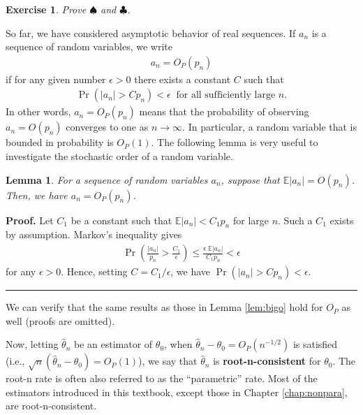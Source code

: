 \documentclass[10.5pt, A4paper, openany, uplatex]{book}
\newcommand{\E}{\mathbb{E}}
\renewcommand{\hat}{\widehat}
\newtheorem{exercise}[theorem]{Exercise}
\newtheorem{lemma}[theorem]{Lemma}
\newenvironment{proof}[1][Proof]{\textbf{#1.} }{\  \rule{0.5em}{0.5em}}
\numberwithin{equation}{section}
\begin{document}
\begin{framed}
	\begin{exercise}\upshape
		Prove $\spadesuit$ and $\clubsuit$.
	\end{exercise}
\end{framed}

So far, we have considered asymptotic behavior of real sequences.
If $a_n$ is a sequence of random variables, we write
\begin{align*}
	a_n = O_P(p_n)
\end{align*}
if for any given number $\epsilon > 0$ there exists a constant $C$ such that 
\begin{align*}
	\Pr(|a_n| > C p_n) < \epsilon \;\; \text{for all sufficiently large $n$.}
\end{align*}
In other words, $a_n = O_P(p_n)$ means that the probability of observing $a_n = O(p_n)$ converges to one as $n \to \infty$.
In particular, a random variable that is bounded in probability is $O_P(1)$.
The following lemma is very useful to investigate the stochastic order of a random variable.
\begin{lemma}\label{lem:markov_order}
For a sequence of random variables $a_n$, suppose that $\E|a_n| = O(p_n)$.
Then, we have $a_n = O_P(p_n)$.
\end{lemma}
\begin{proof}
Let $C_1$ be a constant such that $\E|a_n| < C_1 p_n$ for large $n$.
Such a $C_1$ exists by assumption.
Markov's inequality gives
\begin{align*}
	\Pr\left( \frac{|a_n|}{p_n} > \frac{C_1}{\epsilon} \right) \le \frac{\epsilon \; \E|a_n|}{C_1 p_n} <  \epsilon
\end{align*}
for any $\epsilon > 0$.
Hence, setting $C = C_1/\epsilon$, we have $\Pr\left( |a_n| > C p_n \right) < \epsilon$.
\end{proof}

We can verify that the same results as those in Lemma \ref{lem:bigo} hold for $O_P$ as well (proofs are omitted).

Now, letting $\hat \theta_n$ be an estimator of $\theta_0$, when $\hat \theta_n - \theta_0 = O_P(n^{-1/2})$ is satisfied (i.e., $\sqrt{n}(\hat \theta_n - \theta_0) = O_P(1)$), we say that $\hat \theta_n$ is \textbf{root-n-consistent} for $\theta_0$.
The root-n rate is often also referred to as the ``parametric'' rate.
Most of the estimators introduced in this textbook, except those in Chapter \ref{chap:nonpara}, are root-n-consistent.
\end{document}
